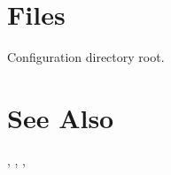 \documentclass[english]{article}
\begin{document}
\section{Files}

\begin{Description}\setlength{\itemsep}{0cm}
\item[\File{~/.ecru}] Configuration directory root.
\end{Description}

\section{See Also}

, , , 
\end{document}
